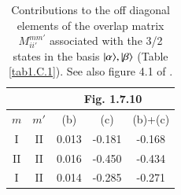 \begin{subappendices}
\begin{table}
\end{table}
\begin{table}
\begin{tabular}{|c|c|c|c|c|}
\hline
\multicolumn{2}{|c}{ }& \multicolumn{3}{|c|}{Fig. 1.7.10} \\
\hline
$m$&$m'$  & (b) & (c) & (b)+(c)    \\
\hline
I & II  & 0.013 & -0.181 & -0.168    \\
II & II  & 0.016 & -0.450 & -0.434    \\
 I & II  & 0.014 & -0.285 & -0.271    \\
\hline
\end{tabular}\caption{Contributions to the off diagonal elements of the overlap matrix $M_{ii'}^{mm'}$ associated with the 3/2 states in the basis $|{\alpha} \rangle,|{\beta} \rangle$ (Table \ref{tab1.C.1}). See also figure 4.1 of \cite{Bortignon:77}.}\label{tab1.C.2}
\end{table}

\end{subappendices}
